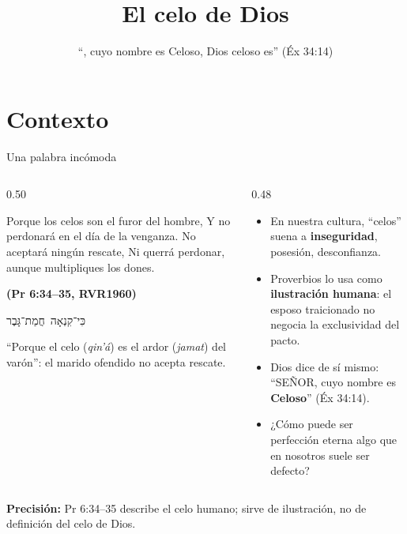 \documentclass[hyperref={bookmarks=false},aspectratio=169]{beamer}
\title[El celo de Dios]{\bfseries{El celo de Dios}}
\subtitle{``\SENOR, cuyo nombre es Celoso, Dios celoso es'' (Éx 34:14)}
\author{}\institute{}\date{}
\newcommand{\heb}[1]{\mbox{\foreignlanguage{hebrew}{#1}}}
\newcommand{\SENOR}{S{\fontsize{0.78em}{1em}\selectfont EÑOR}}
\newcommand{\fuente}[1]{\par\hfill{\upshape\bfseries\footnotesize\textcolor{azul}{#1}}}
\newcommand{\destacar}[1]{\textbf{\textcolor{azul}{#1}}}
\newcommand{\precision}[1]{{\footnotesize\color{gris}\textbf{Precisión:} #1}}
\begin{document}
\frame{\titlepage}


\section{Contexto}

\begin{frame}{Una palabra incómoda}
\begin{columns}[c,onlytextwidth]
\begin{column}{0.50\textwidth}
\begin{cita}Porque los celos son el furor del hombre, Y no perdonará en el día de la venganza. No aceptará ningún rescate, Ni querrá perdonar, aunque multipliques los dones.\fuente{(Pr 6:34--35, RVR1960)}\end{cita}
\begin{center}\heb{כִּי־קִנְאָה חֲמַת־גָּבֶר}\end{center}
\scriptsize ``Porque el celo (\emph{qin'á}) es el ardor (\emph{jamat}) del varón'': el marido ofendido no acepta rescate.
\end{column}
\begin{column}{0.48\textwidth}\small
\begin{itemize}
\item En nuestra cultura, ``celos'' suena a \destacar{inseguridad}, posesión, desconfianza.
\item Proverbios lo usa como \destacar{ilustración humana}: el esposo traicionado no negocia la exclusividad del pacto.
\item Dios dice de sí mismo: ``\SENOR, cuyo nombre es \destacar{Celoso}'' (Éx 34:14).
\item ¿Cómo puede ser perfección eterna algo que en nosotros suele ser defecto?
\end{itemize}
\end{column}
\end{columns}
\precision{Pr 6:34--35 describe el celo humano; sirve de ilustración, no de definición del celo de Dios.}
\end{frame}
\end{document}
